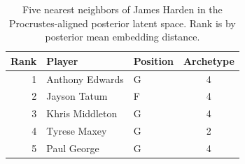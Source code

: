 \begin{table}[htbp]
  \centering\small
  \begin{tabular}{rllc}
    \toprule
    Rank & Player & Position & Archetype \\
    \midrule
    1 & Anthony Edwards & G & 4 \\
    2 & Jayson Tatum & F & 4 \\
    3 & Khris Middleton & G & 4 \\
    4 & Tyrese Maxey & G & 2 \\
    5 & Paul George & G & 4 \\
    \bottomrule
  \end{tabular}
  \caption{Five nearest neighbors of James Harden in the Procrustes-aligned posterior latent space. Rank is by posterior mean embedding distance.}
  \label{tab:James_Harden_neighbors}
\end{table}

